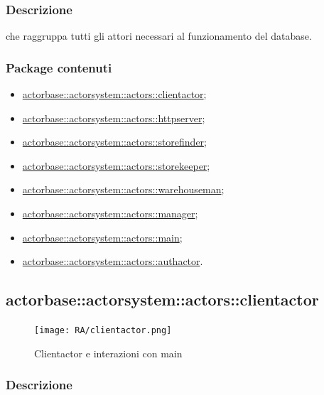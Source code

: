 \documentclass{scalatekids-article}
\begin{document}
\subsubsection{Descrizione}

 che raggruppa tutti gli attori necessari al funzionamento del database.

\subsubsection{Package contenuti}
\begin{itemize}
\item \hyperref[sec:actorbase::actorsystem::actors::clientactor]{actorbase::actorsystem::actors::clientactor};
\item \hyperref[sec:actorbase::actorsystem::actors::httpserver]{actorbase::actorsystem::actors::httpserver};
\item \hyperref[sec:actorbase::actorsystem::actors::storefinder]{actorbase::actorsystem::actors::storefinder};
\item \hyperref[sec:actorbase::actorsystem::actors::storekeeper]{actorbase::actorsystem::actors::storekeeper};
\item \hyperref[sec:actorbase::actorsystem::actors::warehouseman]{actorbase::actorsystem::actors::warehouseman};
\item \hyperref[sec:actorbase::actorsystem::actors::manager]{actorbase::actorsystem::actors::manager};
\item \hyperref[sec:actorbase::actorsystem::actors::main]{actorbase::actorsystem::actors::main};
\item \hyperref[sec:actorbase::actorsystem::actors::authactor]{actorbase::actorsystem::actors::authactor}.
\end{itemize}

\subsection{actorbase::actorsystem::actors::clientactor}
\label{sec:actorbase::actorsystem::actors::clientactor}

\begin{figure}[H]
  \begin{center}
    \texttt{[image: RA/clientactor.png]}
    \caption{Clientactor e interazioni con main}
  \end{center}
\end{figure}

\subsubsection{Descrizione}
\end{document}
